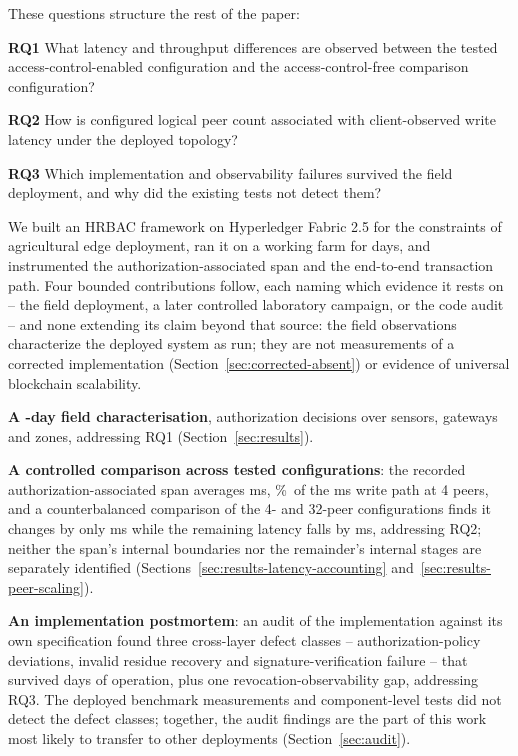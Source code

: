 These questions structure the rest of the paper:

\textbf{RQ1} What latency and throughput differences are observed between the tested access-control-enabled configuration and the access-control-free comparison configuration?

\textbf{RQ2} How is configured logical peer count associated with client-observed write latency under the deployed topology?

\textbf{RQ3} Which implementation and observability failures survived the field deployment, and why did the existing tests not detect them?

We built an HRBAC framework on Hyperledger Fabric 2.5 for the constraints of agricultural edge deployment, ran it on a working farm for \DeploymentDays{} days, and instrumented the authorization-associated span and the end-to-end transaction path. Four bounded contributions follow, each naming which evidence it rests on -- the field deployment, a later controlled laboratory campaign, or the code audit -- and none extending its claim beyond that source: the field observations characterize the deployed system as run; they are not measurements of a corrected implementation (Section~\ref{sec:corrected-absent}) or evidence of universal blockchain scalability.

\textbf{A \DeploymentDays{}-day field characterisation}, \AuthDecisions{} authorization decisions over \Sensors{} sensors, \Gateways{} gateways and \Zones{} zones, addressing RQ1 (Section~\ref{sec:results}).

\textbf{A controlled comparison across tested configurations}: the recorded authorization-associated span averages \SpanLatencyPeerFour{} ms, \SpanSharePeerFour\%\ of the \TotalLatencyPeerFour{} ms write path at 4 peers, and a counterbalanced comparison of the 4- and 32-peer configurations finds it changes by only \SpanDiffFourVThirtyTwo{} ms while the remaining latency falls by \RemainingLatencyDiffFourVThirtyTwo{} ms, addressing RQ2; neither the span's internal boundaries nor the remainder's internal stages are separately identified (Sections~\ref{sec:results-latency-accounting} and~\ref{sec:results-peer-scaling}).

\textbf{An implementation postmortem}: an audit of the implementation against its own specification found three cross-layer defect classes -- authorization-policy deviations, invalid residue recovery and signature-verification failure -- that survived \DeploymentDays{} days of operation, plus one revocation-observability gap, addressing RQ3. The deployed benchmark measurements and component-level tests did not detect the defect classes; together, the audit findings are the part of this work most likely to transfer to other deployments (Section~\ref{sec:audit}).

